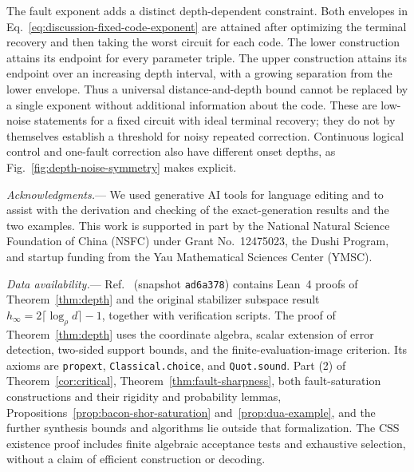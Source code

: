 \documentclass[aps,prl,reprint,notitlepage,nofootinbib,nobibnotes]{revtex4-2}
\newenvironment{acknowledgments}{\par\medskip\noindent\textit{Acknowledgments.}---}{\par\medskip}
\begin{document}
The fault exponent adds a distinct depth-dependent constraint. Both envelopes in Eq.~\eqref{eq:discussion-fixed-code-exponent} are attained after optimizing the terminal recovery and then taking the worst circuit for each code. The lower construction attains its endpoint for every parameter triple. The upper construction attains its endpoint over an increasing depth interval, with a growing separation from the lower envelope. Thus a universal distance-and-depth bound cannot be replaced by a single exponent without additional information about the code. These are low-noise statements for a fixed circuit with ideal terminal recovery; they do not by themselves establish a threshold for noisy repeated correction. Continuous logical control and one-fault correction also have different onset depths, as Fig.~\ref{fig:depth-noise-symmetry} makes explicit.

\begin{acknowledgments}
We used generative AI tools for language editing and to assist with the derivation and checking of the exact-generation results and the two examples. This work is supported in part by the National Natural Science Foundation of China (NSFC) under Grant No.~12475023, the Dushi Program, and startup funding from the Yau Mathematical Sciences Center (YMSC).
\end{acknowledgments}

\textit{Data availability.}---
Ref.~\cite{LeanRepo} (snapshot \texttt{ad6a378}) contains Lean~4 proofs of Theorem~\ref{thm:depth} and the original stabilizer subspace result \(h_\infty=2\lceil\log_\rho d\rceil-1\), together with verification scripts. The proof of Theorem~\ref{thm:depth} uses the coordinate algebra, scalar extension of error detection, two-sided support bounds, and the finite-evaluation-image criterion. Its axioms are \texttt{propext}, \texttt{Classical.choice}, and \texttt{Quot.sound}. Part (2) of Theorem~\ref{cor:critical}, Theorem~\ref{thm:fault-sharpness}, both fault-saturation constructions and their rigidity and probability lemmas, Propositions~\ref{prop:bacon-shor-saturation} and~\ref{prop:dua-example}, and the further synthesis bounds and algorithms lie outside that formalization. The CSS existence proof includes finite algebraic acceptance tests and exhaustive selection, without a claim of efficient construction or decoding.
\end{document}
